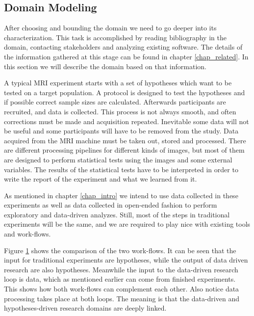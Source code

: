 \subsection{Domain Modeling}

After choosing and bounding the domain we need to go deeper into its characterization. This task is accomplished by reading bibliography in the domain, contacting stakeholders and analyzing existing software. The details of the information gathered at this stage can be found in chapter \ref{chap_related}. In this section we will describe the domain based on that information.

A typical MRI experiment starts with a set of hypotheses which want to be tested on a target population. A protocol is designed to test the hypotheses and if possible correct sample sizes are calculated. Afterwards participants are recruited, and data is collected. This process is not always smooth, and often corrections must be made and acquisition repeated. Inevitable some data will not be useful and some participants will have to be removed from the study. Data acquired from the MRI machine must be taken out, stored and processed. There are different processing pipelines for different kinds of images, but most of them are designed to perform statistical tests using the images and some external variables. The results of the statistical tests have to be interpreted in order to write the report of the experiment and what we learned from it.

As mentioned in chapter \ref{chap_intro} we intend to use data collected in these experiments as well as data collected in open-ended fashion to perform exploratory and data-driven analyzes. Still, most of the steps in traditional experiments will be the same, and we are required to play nice with existing tools and work-flows. 

\begin{figure}

\caption{\label{fig_workflows}}
\end{figure}

Figure \ref{fig_workflows} shows the comparison of the two work-flows. It can be seen that the input for traditional experiments are hypotheses, while the output of data driven research are also hypotheses. Meanwhile the input to the data-driven research loop is data, which as mentioned earlier can come from finished experiments. This shows how both work-flows can complement each other. Also notice data processing takes place at both loops. The meaning is that the data-driven and hypotheses-driven research domains are deeply linked.  

